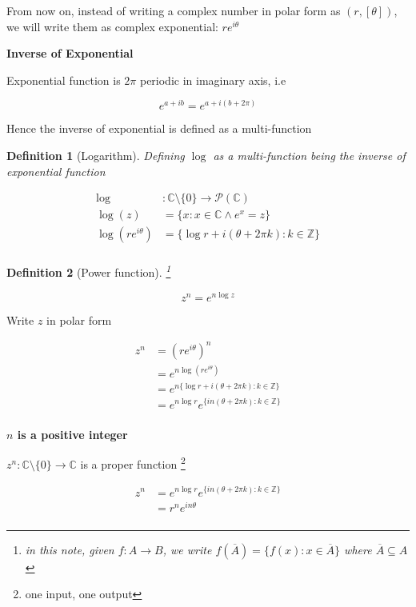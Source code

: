 \documentclass{article}
\newtheorem{definition}{Definition}
\begin{document}
From now on, instead of writing a complex number in polar form as $(r, [\theta])$, we will write them as complex exponential: $r e^{i\theta}$

\textbf{Inverse of Exponential}

Exponential function is $2\pi$ periodic in imaginary axis, i.e

$$
    e^{a + ib} = e^{a + i(b+2\pi)}
$$

Hence the inverse of exponential is defined as a multi-function

\begin{definition}[Logarithm]
Defining $\log$ as a multi-function being the inverse of exponential function

\begin{align*}
    \log &: \mathbb{C} \setminus \{ 0 \} \to \mathcal{P}(\mathbb{C}) \\
    \log(z) &= \{x: x \in \mathbb{C} \land e^x = z\} \\
    \log(r e^{i\theta}) &= \{\log r + i (\theta + 2\pi k): k \in \mathbb{Z}\} \\
\end{align*}
\end{definition}

\begin{definition}[Power function] \footnote{in this note, given $f: A \to B$, we write $f(\overline{A}) = \{f(x): x \in \overline{A}\}$ where $\overline{A} \subseteq A$}

$$
    z^n = e^{n \log z}
$$
\end{definition}

Write $z$ in polar form

\begin{align*}
    z^n &= (r e^{i\theta})^n \\
        &= e^{n \log (r e^{i\theta})} \\
        &= e^{n \{ \log r + i (\theta + 2 \pi k): k \in \mathbb{Z} \}} \\
        &= e^{n \log r} e^ {\{ i n (\theta + 2 \pi k): k \in \mathbb{Z} \}} \\
\end{align*}

\textbf{$n$ is a positive integer}

$z^n: \mathbb{C} \setminus \{ 0 \} \to \mathbb{C}$ is a proper function \footnote{one input, one output}

\begin{align*}
    z^n &= e^{n \log r} e^ {\{ i n (\theta + 2 \pi k): k \in \mathbb{Z} \}} \\
        &= r^n e^{i n \theta} \\ 
\end{align*}
\end{document}
